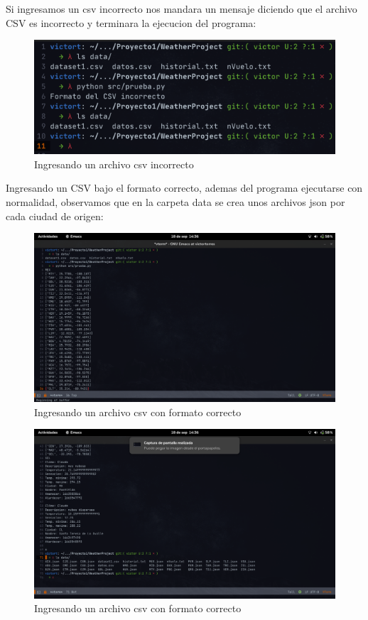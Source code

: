 \documentclass[12pt]{article}
\begin{document}
Si ingresamos un csv incorrecto nos mandara un mensaje diciendo que el archivo CSV es incorrecto y terminara la ejecucion del programa:
\begin{figure}[ht]
  \centering
  \includegraphics[scale=0.5]{figures/csvmalo}
  \caption{Ingresando un archivo csv incorrecto}
\end{figure}
Ingresando un CSV bajo el formato correcto, ademas del programa ejecutarse con normalidad, observamos que en la carpeta data se crea unos archivos json por cada ciudad de origen:
\begin{figure}[ht]
  \centering
  \includegraphics[scale=0.3]{figures/csv1}
  \caption{Ingresando un archivo csv con formato correcto}
\end{figure}
\newpage
\begin{figure}[ht]
  \centering
  \includegraphics[scale=0.3]{figures/csv2}
  \caption{Ingresando un archivo csv con formato correcto}
\end{figure}
\end{document}
